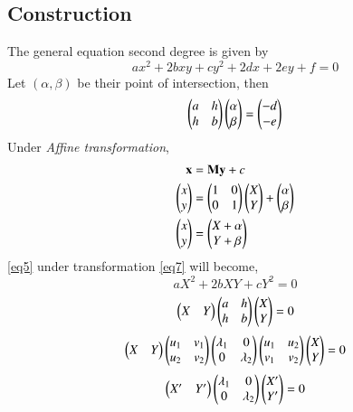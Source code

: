 \documentclass[journal,12pt,twocolumn]{IEEEtran}
\begin{document}
\subsection{Construction}
The general equation second degree is given by
\begin{equation}\label{eq5}
	ax^2 + 2bxy + cy^2 + 2dx + 2ey + f = 0
\end{equation}
Let $(\alpha,\beta)$ be their point of intersection, then
\begin{equation}\label{eq6}
	\begin{pmatrix} a & h\\ h & b\end{pmatrix}\begin{pmatrix}\alpha \\ \beta\end{pmatrix} = \begin{pmatrix}-d \\ -e\end{pmatrix}
\end{equation}
Under \textit{Affine transformation},
\begin{align}
	\mathbf{x} &= \mathbf{M}\mathbf{y} + c\\
	\begin{pmatrix}x \\ y\end{pmatrix} &= \begin{pmatrix}1 & 0 \\ 0 & 1\end{pmatrix} \begin{pmatrix}X \\ Y\end{pmatrix} + \begin{pmatrix}\alpha \\ \beta\end{pmatrix}\\
	\label{eq7}\begin{pmatrix}x \\ y\end{pmatrix} &= \begin{pmatrix}X+\alpha \\ Y+\beta\end{pmatrix}
\end{align}
\eqref{eq5} under transformation \eqref{eq7} will become,
\begin{equation}\label{eq8}
	aX^2 + 2bXY + cY^2 = 0
\end{equation}
\begin{equation}\label{eq9}
	\begin{pmatrix}X & Y\end{pmatrix} \begin{pmatrix}a & h \\ h & b\end{pmatrix} \begin{pmatrix}X \\ Y\end{pmatrix} = 0
\end{equation}
\begin{equation}\label{eq11}
	\begin{pmatrix}X & Y\end{pmatrix} \begin{pmatrix}u_1 & v_1 \\ u_2 & v_2\end{pmatrix} \begin{pmatrix}\lambda_1 & 0\\ 0 & \lambda_2\end{pmatrix} \begin{pmatrix}u_1 & u_2 \\ v_1 & v_2\end{pmatrix} \begin{pmatrix}X \\ Y\end{pmatrix} = 0
\end{equation}
\begin{equation}
	\begin{pmatrix}X^\prime & Y^\prime\end{pmatrix}  \begin{pmatrix}\lambda_1 & 0\\ 0 & \lambda_2\end{pmatrix} \begin{pmatrix}X^\prime \\ Y^\prime\end{pmatrix} = 0
\end{equation}
\end{document}
